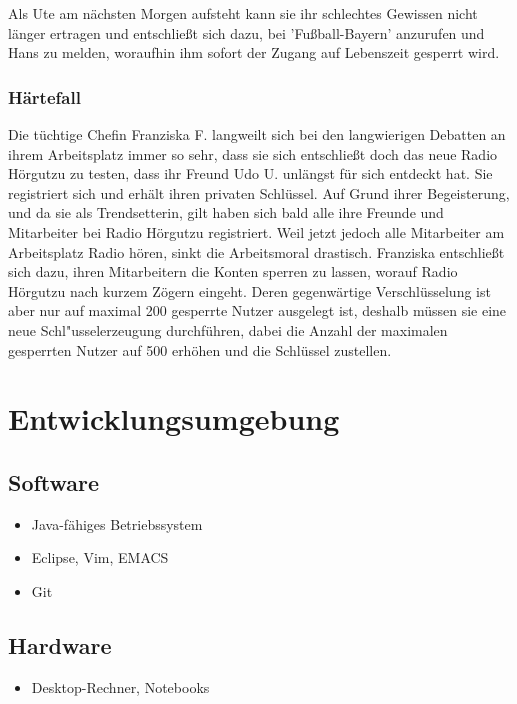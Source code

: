 \documentclass[a4paper,10pt]{scrartcl}
\begin{document}
Als Ute am nächsten Morgen aufsteht kann sie ihr schlechtes Gewissen nicht länger ertragen und entschließt sich dazu, bei 'Fußball-Bayern' anzurufen und
Hans zu melden, woraufhin ihm sofort der Zugang auf Lebenszeit gesperrt wird.

\subsubsection{Härtefall}
Die tüchtige Chefin Franziska F. langweilt sich bei den langwierigen
Debatten an ihrem Arbeitsplatz immer so sehr, dass sie sich entschließt doch
das neue Radio Hörgutzu zu testen, dass ihr Freund Udo U. unlängst für sich entdeckt hat.
Sie registriert sich und erhält ihren privaten Schlüssel.
Auf Grund ihrer Begeisterung, und da sie als Trendsetterin, gilt haben sich bald alle ihre Freunde
und Mitarbeiter bei Radio Hörgutzu registriert. Weil jetzt jedoch alle Mitarbeiter am Arbeitsplatz
Radio hören, sinkt die Arbeitsmoral drastisch. Franziska entschließt sich dazu, ihren Mitarbeitern
die Konten sperren zu lassen, worauf Radio Hörgutzu nach kurzem Zögern eingeht. Deren
gegenwärtige Verschlüsselung ist aber nur auf maximal 200 gesperrte
Nutzer ausgelegt ist, deshalb müssen sie eine neue Schl"usselerzeugung durchführen,
dabei die Anzahl der maximalen gesperrten Nutzer auf 500 erhöhen und die Schlüssel zustellen.


\section{Entwicklungsumgebung}

\subsection{Software}
\begin{itemize}
\item Java-fähiges Betriebssystem
\item Eclipse, Vim, EMACS
\item Git
\end{itemize}
\subsection{Hardware}
\begin{itemize}
\item Desktop-Rechner, Notebooks
\end{itemize}


\clearpage



{}

\end{document}

